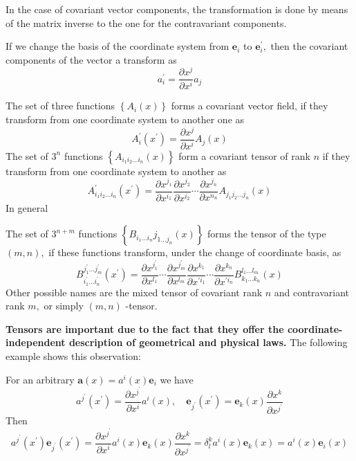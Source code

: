 In the case of covariant vector components, the transformation is done by means of the matrix inverse to the one for the contravariant components.
\begin{thm}
If we change the basis of the coordinate system from $\mathbf{e}_{i}$ to $\mathbf{e}_{i}^{\prime},$ then the covariant components of the vector a transform as
\begin{equation}
a_{i}^{\prime}=\frac{\partial x^{j}}{\partial x^{i}} a_{j}
\end{equation}
\end{thm}

 The set of three functions $\left\{A_{i}(x)\right\}$ forms a covariant vector field, if they transform from one coordinate system to another one as
 \begin{equation}
A_{i}^{\prime}\left(x^{\prime}\right)=\frac{\partial x^{j}}{\partial x^{i}} A_{j}(x)
\end{equation}
The set of $3^{n}$ functions $\left\{A_{i_{1} i_{2} \ldots i_{n}}(x)\right\}$ form a covariant tensor of rank $n$ if they transform from one coordinate system to another as
\begin{equation}
A_{i_{1} i_{2} \ldots i_{n}}^{\prime}\left(x^{\prime}\right)=\frac{\partial x^{j_{1}}}{\partial x^{i_{1}}} \frac{\partial x^{j_{2}}}{\partial x^{i_{2}}} \cdots \frac{\partial x^{j_{n}}}{\partial x^{n_{n}}} A_{j_{1} j_{2} \ldots j_{n}}(x)
\end{equation}
In general
\begin{qt}
The set of $3^{n+m}$ functions $\left\{B_{i_{1} \ldots i_{n}} j_{1 \ldots j_{n}}(x)\right\}$ forms the tensor of the type $(m, n),$ if these functions transform, under the change of coordinate basis, as
\begin{equation}
B_{i_{1}^{\prime} \ldots i_{n}^{\prime}} ^{j_{1}^{\prime} \ldots j_{m}^{\prime}}\left(x^{\prime}\right)=\frac{\partial x^{j^{\prime}_1}}{\partial x^{l_{1}}} \cdots \frac{\partial x^{j_{m}^{\prime}}}{\partial x^{l_{m}}} \frac{\partial x^{k_{1}}}{\partial x^{\prime i_{1}}} \cdots \frac{\partial x^{k_{n}}}{\partial x^{\prime i_{n}}} B_{k_{1} \ldots k_{n}}^{l_{1} \ldots l_{m}}(x)
\end{equation}
Other possible names are the mixed tensor of covariant rank $n$ and contravariant rank $m,$ or simply $(m, n)$ -tensor.
\end{qt}
\textbf{Tensors are important due to the fact that they offer the coordinate-independent description of geometrical and physical laws.} The following example shows this observation:
\begin{example}
For an arbitrary $\mathbf{a}(x)=a^{i}(x) \mathbf{e}_{i}$ we have
$$
a^{j^{\prime}}\left(x^{\prime}\right)=\frac{\partial x^{j^{\prime}}}{\partial x^{i}} a^{i}(x), \quad \mathbf{e}_{j^{\prime}}\left(x^{\prime}\right)=\mathbf{e}_{k}(x) \frac{\partial x^{k}}{\partial x^{j^{\prime}}}
$$
Then
$$
a^{j^{\prime}}\left(x^{\prime}\right) \mathbf{e}_{j^{\prime}}\left(x^{\prime}\right)=\frac{\partial x^{j^{\prime}}}{\partial x^{i}} a^{i}(x) \mathbf{e}_{k}(x) \frac{\partial x^{k}}{\partial x^{j^{\prime}}}=\delta_{l}^{k} a^{i}(x) \mathbf{e}_{k}(x)=a^{i}(x) \mathbf{e}_{i}(x)
$$
\end{example}

